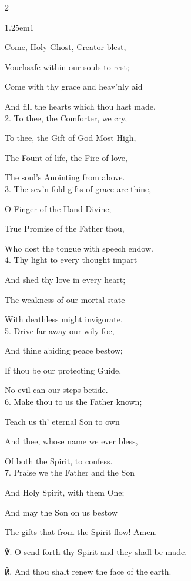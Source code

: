 \begin{multicols}{2}
\begin{hangparas}{1.25em}{1}


Come, Holy Ghost, Creator blest,

Vouchsafe within our souls to rest;

Come with thy grace and heav'nly aid

And fill the hearts which thou hast made.\\

2. To thee, the Comforter, we cry,

To thee, the Gift of God Most High,

The Fount of life, the Fire of love,

The soul's Anointing from above.\\

3. The sev'n-fold gifts of grace are thine,

O Finger of the Hand Divine;

True Promise of the Father thou,

Who dost the tongue with speech endow.\\

4. Thy light to every thought impart

And shed thy love in every heart;

The weakness of our mortal state

With deathless might invigorate.\\

5. Drive far away our wily foe,

And thine abiding peace bestow;

If thou be our protecting Guide,

No evil can our steps betide.\\

6. Make thou to us the Father known;

Teach us th' eternal Son to own

And thee, whose name we ever bless,

Of both the Spirit, to confess.\\

7. Praise we the Father and the Son

And Holy Spirit, with them One;

And may the Son on us bestow

The gifts that from the Spirit flow! Amen.\\
\end{hangparas}

℣. O send forth thy Spirit and they shall be made.\par
℟. And thou shalt renew the face of the earth.
\end{multicols}

